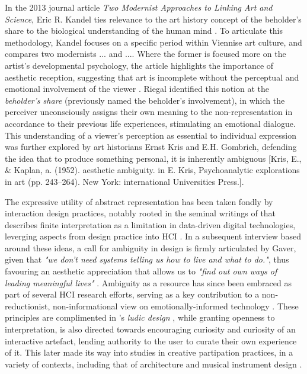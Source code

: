 
In the 2013 journal article \textit{Two Modernist Approaches to Linking Art and Science}, Eric R. Kandel ties relevance to the art history concept of the beholder's share to the biological understanding of the human mind \cite{kandel_two_2013}. To articulate this methodology, Kandel focuses on a specific period within Viennise art culture, and compares two modernists ... and .... Where the former is focused more on the artist's developmental psychology, the article highlights the importance of aesthetic reception, suggesting that art is incomplete without the perceptual and emotional involvement of the viewer \cite{riegl_group_1999}. Riegal identified this notion at the \textit{beholder's share} (previously named the beholder's involvement), in which the perceiver unconsciously assigns their own meaning to the non-representation in accordance to their previous life experiences, stimulating an emotional dialogue. This understanding of a viewer's perception as essential to individual expression was further explored by art historians Ernst Kris and E.H. Gombrich, defending the idea that to produce something personal, it is inherently ambiguous [Kris, E., \& Kaplan, a. (1952). aesthetic ambiguity. in E. Kris, Psychoanalytic explorations in art (pp. 243–264). New York: international Universities Press.].


The expressive utility of abstract representation has been taken fondly by interaction design practices, notably rooted in the seminal writings of \citeauthor{gaver_ambiguity_2003} that describes finite interpretation as a limitation in data-driven digital technologies, leverging aspects from design practice into HCI \cite{gaver_ambiguity_2003}. In a subsequent interview based around these ideas, a call for ambiguity in design is firmly articulated by Gaver, given that \textit{"we don’t need systems telling us how to live and what to do."}, thus favouring an aesthetic appreciation that allows us to \textit{"find out own ways of leading meaningful lives"} \cite{gaver_gaffney_2007}. Ambiguity as a resource has since been embraced as part of several HCI research efforts, serving as a key contribution to a non-reductionist, non-informational view on emotionally-informed technology \cite{sanches_ambiguity_2019,stahl_evocative_2014}. These principles are complimented in \citeauthor{gaver_drift_2004}'s \textit{ludic design} \cite{gaver_drift_2004}, while granting openness to interpretation, is also directed towards encouraging curiosity and curiosity of an interactive artefact, lending authority to the user to curate their own experience of it. This later made its way into studies in creative partipation practices, in a variety of contexts, including that of architecture and musical instrument design \cite{harriss_ludic_2010,mcpherson_designing_2016}.

